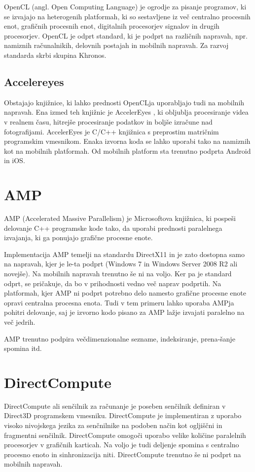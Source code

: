 OpenCL (angl. Open Computing Language) \cite{opencl} je ogrodje za pisanje programov, ki se izvajajo na heterogenih platformah, ki so sestavljene iz več centralno procesnih enot, grafičnih procesnih enot, digitalnih procesorjev signalov in drugih procesorjev. OpenCL je odprt standard, ki je podprt na različnih napravah, npr. namiznih računalnikih, delovnih postajah in mobilnih napravah. Za razvoj standarda skrbi skupina Khronos.

\subsection{Accelereyes}

Obstajajo knjižnice, ki lahko prednosti OpenCLja uporabljajo tudi na mobilnih napravah. Ena izmed teh knjižnic je AccelerEyes \cite{accelereyes}, ki obljublja procesiranje videa v realnem času, hitrejše procesiranje podatkov in boljše izračune nad fotografijami. AccelerEyes je C/C++ knjižnica s preprostim matričnim programskim vmesnikom. Enaka izvorna koda se lahko uporabi tako na namiznih kot na mobilnih platformah. Od mobilnih platform sta trenutno podprta Android in iOS.

\section{AMP}

AMP (Accelerated Massive Parallelism) je Microsoftova knjižnica, ki pospeši delovanje C++ programske kode tako, da uporabi prednosti paralelnega izvajanja, ki ga ponujajo grafične procesne enote. 

Implementacija AMP temelji na standardu DirectX11 in je zato dostopna samo na napravah, kjer je le-ta podprt (Windows 7 in Windows Server 2008 R2 ali novejše). Na mobilnih napravah trenutno še ni na voljo. Ker pa je standard odprt, se pričakuje, da bo v prihodnosti vedno več naprav podprtih. Na platformah, kjer AMP ni podprt potrebno delo namesto grafične procesne enote opravi centralna procesna enota. Tudi v tem primeru lahko uporaba AMPja pohitri delovanje, saj je izvorno kodo pisano za AMP lažje izvajati paralelno na več jedrih.

AMP trenutno podpira večdimenzionalne sezname, indeksiranje, prena-šanje spomina itd.

\section{DirectCompute}

DirectCompute \cite{directcompute} ali senčilnik za računanje je poseben senčilnik definiran v Direct3D programskem vmesniku. DirectCompute je implementiran z uporabo visoko nivojskega jezika za senčnilnike na podoben način kot ogljiščni in fragmentni senčilnik. DirectCompute omogoči uporabo velike količine paralelnih procesorjev v grafičnih karticah. Na voljo je tudi deljenje spomina s centralno procesno enoto in sinhronizacija niti. DirectCompute trenutno še ni podprt na mobilnih napravah.

